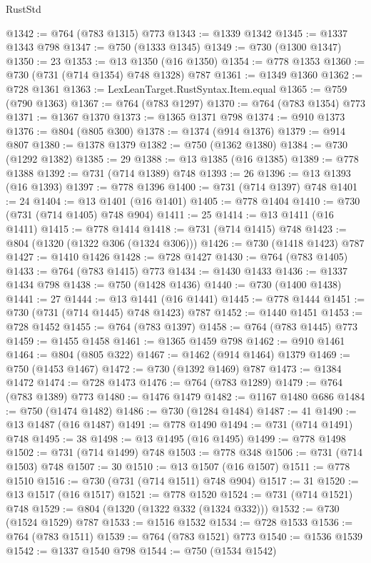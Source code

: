 \begin{lexlean}{RustStd}
\begin{coremodule}
@1342 := @764 (@783 @1315) @773
@1343 := @1339 @1342
@1345 := @1337 @1343 @798
@1347 := @750 (@1333 @1345)
@1349 := @730 (@1300 @1347)
@1350 := 23
@1353 := @13 @1350 (@16 @1350)
@1354 := @778 @1353
@1360 := @730 (@731 (@714 @1354) @748 @1328) @787
@1361 := @1349 @1360
@1362 := @728 @1361
@1363 := LexLeanTarget.RustSyntax.Item.equal
@1365 := @759 (@790 @1363)
@1367 := @764 (@783 @1297)
@1370 := @764 (@783 @1354) @773
@1371 := @1367 @1370
@1373 := @1365 @1371 @798
@1374 := @910 @1373
@1376 := @804 (@805 @300)
@1378 := @1374 (@914 @1376)
@1379 := @914 @807
@1380 := @1378 @1379
@1382 := @750 (@1362 @1380)
@1384 := @730 (@1292 @1382)
@1385 := 29
@1388 := @13 @1385 (@16 @1385)
@1389 := @778 @1388
@1392 := @731 (@714 @1389) @748
@1393 := 26
@1396 := @13 @1393 (@16 @1393)
@1397 := @778 @1396
@1400 := @731 (@714 @1397) @748
@1401 := 24
@1404 := @13 @1401 (@16 @1401)
@1405 := @778 @1404
@1410 := @730 (@731 (@714 @1405) @748 @904)
@1411 := 25
@1414 := @13 @1411 (@16 @1411)
@1415 := @778 @1414
@1418 := @731 (@714 @1415) @748
@1423 := @804 (@1320 (@1322 @306 (@1324 @306)))
@1426 := @730 (@1418 @1423) @787
@1427 := @1410 @1426
@1428 := @728 @1427
@1430 := @764 (@783 @1405)
@1433 := @764 (@783 @1415) @773
@1434 := @1430 @1433
@1436 := @1337 @1434 @798
@1438 := @750 (@1428 @1436)
@1440 := @730 (@1400 @1438)
@1441 := 27
@1444 := @13 @1441 (@16 @1441)
@1445 := @778 @1444
@1451 := @730 (@731 (@714 @1445) @748 @1423) @787
@1452 := @1440 @1451
@1453 := @728 @1452
@1455 := @764 (@783 @1397)
@1458 := @764 (@783 @1445) @773
@1459 := @1455 @1458
@1461 := @1365 @1459 @798
@1462 := @910 @1461
@1464 := @804 (@805 @322)
@1467 := @1462 (@914 @1464) @1379
@1469 := @750 (@1453 @1467)
@1472 := @730 (@1392 @1469) @787
@1473 := @1384 @1472
@1474 := @728 @1473
@1476 := @764 (@783 @1289)
@1479 := @764 (@783 @1389) @773
@1480 := @1476 @1479
@1482 := @1167 @1480 @686
@1484 := @750 (@1474 @1482)
@1486 := @730 (@1284 @1484)
@1487 := 41
@1490 := @13 @1487 (@16 @1487)
@1491 := @778 @1490
@1494 := @731 (@714 @1491) @748
@1495 := 38
@1498 := @13 @1495 (@16 @1495)
@1499 := @778 @1498
@1502 := @731 (@714 @1499) @748
@1503 := @778 @348
@1506 := @731 (@714 @1503) @748
@1507 := 30
@1510 := @13 @1507 (@16 @1507)
@1511 := @778 @1510
@1516 := @730 (@731 (@714 @1511) @748 @904)
@1517 := 31
@1520 := @13 @1517 (@16 @1517)
@1521 := @778 @1520
@1524 := @731 (@714 @1521) @748
@1529 := @804 (@1320 (@1322 @332 (@1324 @332)))
@1532 := @730 (@1524 @1529) @787
@1533 := @1516 @1532
@1534 := @728 @1533
@1536 := @764 (@783 @1511)
@1539 := @764 (@783 @1521) @773
@1540 := @1536 @1539
@1542 := @1337 @1540 @798
@1544 := @750 (@1534 @1542)

\end{coremodule}
\end{lexlean}
